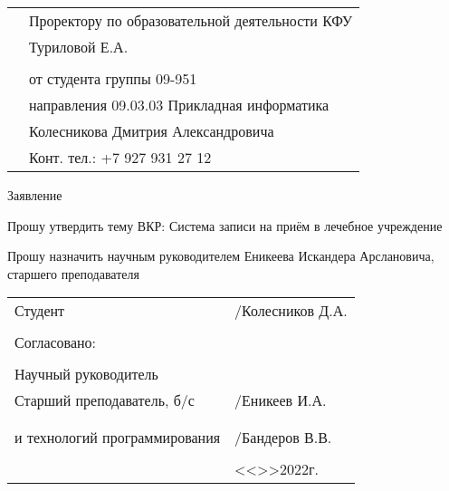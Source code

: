 \documentclass[a4paper]{article}
\begin{document}
    \begin{titlepage}
        \begin{xltabular}{\textwidth} {
                >{\hsize} X
                >{\hsize} X }
            & Проректору по образовательной деятельности КФУ \\
            & Туриловой Е.А. \\
            & \\
            & от студента группы 09-951 \\
            & направления 09.03.03 Прикладная информатика \\
            & Колесникова Дмитрия Александровича \\
            & Конт. тел.: +7 927 931 27 12 \\
        \end{xltabular}

        \begin{center}
            Заявление
        \end{center}

        \begin{flushleft}
            Прошу утвердить тему ВКР: Система записи на приём в лечебное учреждение \\
        \end{flushleft}

        \begin{flushleft}
            Прошу назначить научным руководителем Еникеева Искандера Арслановича, старшего преподавателя
        \end{flushleft}

        \vfill

        \begin{xltabular}{\textwidth} {
                >{\hsize} X
                >{\hsize} X }
            Студент & \underline{\hspace{3cm}}/Колесников Д.А. \\
            & \\
            Согласовано: & \\
            & \\
            Научный руководитель & \\
            Старший преподаватель, б/с & \underline{\hspace{3cm}}/Еникеев И.А. \\
            & \\
             \\
            и технологий программирования & \underline{\hspace{3cm}}/Бандеров В.В. \\
            & \\
            & <<\underline{\hspace{1cm}}>>\underline{\hspace{3cm}}2022г. \\
        \end{xltabular}
    \end{titlepage}
\end{document}

